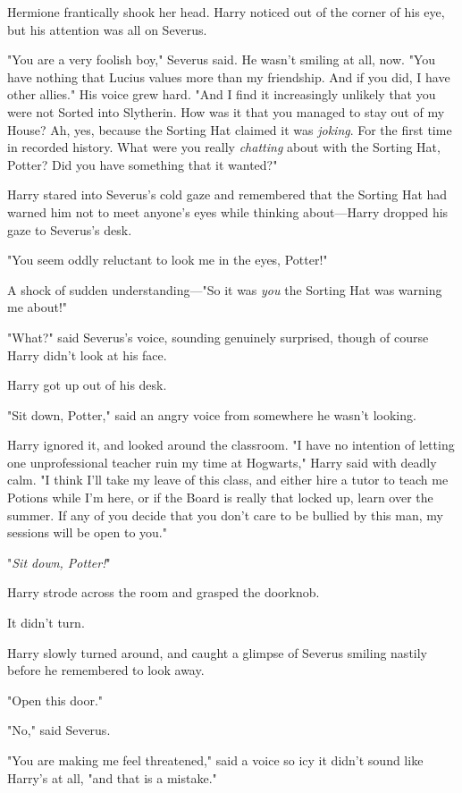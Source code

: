 Hermione frantically shook her head. Harry noticed out of the corner of his 
eye, but his attention was all on Severus.

"You are a very foolish boy," Severus said. He wasn't smiling at all, now. "You 
have nothing that Lucius values more than my friendship. And if you did, I have 
other allies." His voice grew hard. "And I find it increasingly unlikely that 
you were not Sorted into Slytherin. How was it that you managed to stay out of 
my House? Ah, yes, because the Sorting Hat claimed it was \emph{joking}. For 
the first time in recorded history. What were you really \emph{chatting} about 
with the Sorting Hat, Potter? Did you have something that it wanted?"

Harry stared into Severus's cold gaze and remembered that the Sorting Hat had 
warned him not to meet anyone's eyes while thinking about---Harry dropped his 
gaze to Severus's desk.

"You seem oddly reluctant to look me in the eyes, Potter!"

A shock of sudden understanding---"So it was \emph{you} the Sorting Hat was 
warning me about!"

"What?" said Severus's voice, sounding genuinely surprised, though of course 
Harry didn't look at his face.

Harry got up out of his desk.

"Sit down, Potter," said an angry voice from somewhere he wasn't looking.

Harry ignored it, and looked around the classroom. "I have no intention of 
letting one unprofessional teacher ruin my time at Hogwarts," Harry said with 
deadly calm. "I think I'll take my leave of this class, and either hire a tutor 
to teach me Potions while I'm here, or if the Board is really that locked up, 
learn over the summer. If any of you decide that you don't care to be bullied 
by this man, my sessions will be open to you."

"\emph{Sit down, Potter!}"

Harry strode across the room and grasped the doorknob.

It didn't turn.

Harry slowly turned around, and caught a glimpse of Severus smiling nastily 
before he remembered to look away.

"Open this door."

"No," said Severus.

"You are making me feel threatened," said a voice so icy it didn't sound like 
Harry's at all, "and that is a mistake."

